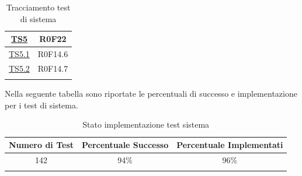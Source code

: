 \documentclass[../PianoDiQualifica.tex]{subfiles}
\begin{document}
\begin{longtable}{|c|c|}
	
		\hyperlink{TS5}{TS5} & R0F22   \\
		\hline
		\hyperlink{TS5.1}{TS5.1} & R0F14.6   \\
		\hline
		\hyperlink{TS5.2}{TS5.2} & R0F14.7   \\
		\hline
		\caption[Tracciamento test di sistema]{Tracciamento test di sistema}
		\label{tabella:TracciamentoTestSistema}
	\end{longtable}
	Nella seguente tabella sono riportate le percentuali di successo e implementazione per i test di sistema.
	\normalsize
	\begin{longtable}{|c|c|c|}
		\hline
		\textbf{Numero di Test} & \textbf{Percentuale Successo} & \textbf{Percentuale Implementati}\\
		\hline
		\endhead
		142 & %
		94\% & %
		96\%\\
		\hline
		\caption[Stato implementazione test sistema]{Stato implementazione test sistema}
		\label{tabella:Stato implementazione test sistema}
	\end{longtable}
	
\newpage
\end{document}
